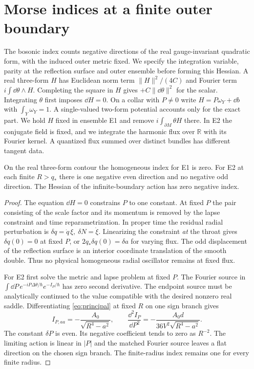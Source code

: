 \section{Morse indices at a finite outer boundary}\label{sec:morse}
The bosonic index counts negative directions of the real gauge-invariant quadratic form, with the induced outer metric fixed. We specify the integration variable, parity at the reflection surface and outer ensemble before forming this Hessian. A real three-form $H$ has Euclidean norm term $\|H\|^2/(4C)$ and Fourier term $i\int\dd\theta\wedge H$. Completing the square in $H$ gives $+C\|\dd\theta\|^2$ for the scalar. Integrating $\theta$ first imposes $\dd H=0$. On a collar with $P\ne0$ write $H=P\omega_Y+\dd b$ with $\int_Y\omega_Y=1$. A single-valued two-form potential accounts only for the exact part. We hold $H$ fixed in ensemble E1 and remove $i\int_{\partial M}\theta H$ there. In E2 the conjugate field is fixed, and we integrate the harmonic flux over $\mathbb R$ with its Fourier kernel. A quantized flux summed over distinct bundles has different tangent data.

\begin{proposition}\label{prop:hom}
On the real three-form contour the homogeneous index for E1 is zero. For E2 at each finite $R>q_*$ there is one negative even direction and no negative odd direction. The Hessian of the infinite-boundary action has zero negative index.
\end{proposition}
\begin{proof}
The equation $\dd H=0$ constrains $P$ to one constant. At fixed $P$ the pair consisting of the scale factor and its momentum is removed by the lapse constraint and time reparametrization. In proper time the residual radial perturbation is $\delta q=\dot q\,\xi,\ \delta N=\dot\xi$. Linearizing the constraint \emph{at} the throat gives $\delta q(0)=0$ at fixed $P$, or $2q_*\delta q(0)=\delta a$ for varying flux. The odd displacement of the reflection surface is an interior coordinate translation of the smooth double. Thus no physical homogeneous radial oscillator remains at fixed flux.

For E2 first solve the metric and lapse problem at fixed $P$. The Fourier source in $\int\dd P\,e^{-iP\Delta\theta/\hbar}e^{-I_P/\hbar}$ has zero second derivative. The endpoint source must be analytically continued to the value compatible with the desired nonzero real saddle. Differentiating \eqref{eq:principal} at fixed $R$ on one sign branch gives
\begin{equation}
 I_{P,aa}= -\frac{A_0}{\sqrt{R^4-a^2}},\qquad
 \frac{\dd^2 I_P}{\dd P^2}=-\frac{A_0d}{36V^2\sqrt{R^4-a^2}} .
 \label{eq:fluxhess}
\end{equation}
The constant $\delta P$ is even. Its negative coefficient tends to zero as $R^{-2}$. The limiting action is linear in $|P|$ and the matched Fourier source leaves a flat direction on the chosen sign branch. The finite-radius index remains one for every finite radius.
\end{proof}

